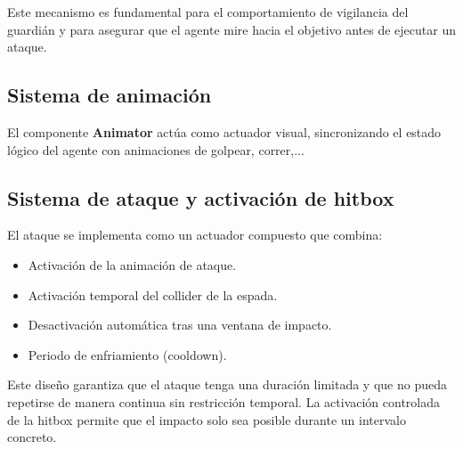 \documentclass[a4paper,12pt]{article}
\begin{document}
Este mecanismo es fundamental para el comportamiento de vigilancia del guardián y para asegurar que el agente mire hacia el objetivo antes de ejecutar un ataque.

\subsection*{Sistema de animación}

El componente \textbf{Animator} actúa como actuador visual, sincronizando el estado lógico del agente con animaciones de golpear, correr,...

\subsection*{Sistema de ataque y activación de hitbox}

El ataque se implementa como un actuador compuesto que combina:

\begin{itemize}
    \item Activación de la animación de ataque.
    \item Activación temporal del collider de la espada.
    \item Desactivación automática tras una ventana de impacto.
    \item Periodo de enfriamiento (cooldown).
\end{itemize}

Este diseño garantiza que el ataque tenga una duración limitada y que no pueda repetirse de manera continua sin restricción temporal. La activación controlada de la hitbox permite que el impacto solo sea posible durante un intervalo concreto.
\end{document}
